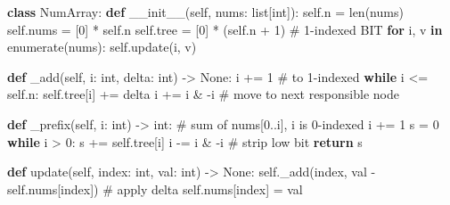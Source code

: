 \documentclass[11pt]{article}
\newenvironment{Shaded}{\begin{snugshade}}{\end{snugshade}}
\newcommand{\BuiltInTok}[1]{\textcolor[rgb]{0.50,0.55,0.55}{#1}}
\newcommand{\CommentTok}[1]{\textcolor[rgb]{0.48,0.49,0.49}{#1}}
\newcommand{\ControlFlowTok}[1]{\textcolor[rgb]{0.99,0.74,0.29}{\textbf{#1}}}
\newcommand{\DecValTok}[1]{\textcolor[rgb]{0.96,0.45,0.00}{#1}}
\newcommand{\FunctionTok}[1]{\textcolor[rgb]{0.56,0.27,0.68}{#1}}
\newcommand{\KeywordTok}[1]{\textcolor[rgb]{0.81,0.81,0.76}{\textbf{#1}}}
\newcommand{\NormalTok}[1]{\textcolor[rgb]{0.81,0.81,0.76}{#1}}
\newcommand{\OperatorTok}[1]{\textcolor[rgb]{0.81,0.81,0.76}{#1}}
\newcommand{\VariableTok}[1]{\textcolor[rgb]{0.15,0.68,0.68}{#1}}
\begin{document}
\begin{Shaded}
\begin{Highlighting}[]
\KeywordTok{class}\NormalTok{ NumArray:}
    \KeywordTok{def} \FunctionTok{\_\_init\_\_}\NormalTok{(}\VariableTok{self}\NormalTok{, nums: }\BuiltInTok{list}\NormalTok{[}\BuiltInTok{int}\NormalTok{]):}
        \VariableTok{self}\NormalTok{.n }\OperatorTok{=} \BuiltInTok{len}\NormalTok{(nums)}
        \VariableTok{self}\NormalTok{.nums }\OperatorTok{=}\NormalTok{ [}\DecValTok{0}\NormalTok{] }\OperatorTok{*} \VariableTok{self}\NormalTok{.n}
        \VariableTok{self}\NormalTok{.tree }\OperatorTok{=}\NormalTok{ [}\DecValTok{0}\NormalTok{] }\OperatorTok{*}\NormalTok{ (}\VariableTok{self}\NormalTok{.n }\OperatorTok{+} \DecValTok{1}\NormalTok{)      }\CommentTok{\# 1{-}indexed BIT}
        \ControlFlowTok{for}\NormalTok{ i, v }\KeywordTok{in} \BuiltInTok{enumerate}\NormalTok{(nums):}
            \VariableTok{self}\NormalTok{.update(i, v)}

    \KeywordTok{def}\NormalTok{ \_add(}\VariableTok{self}\NormalTok{, i: }\BuiltInTok{int}\NormalTok{, delta: }\BuiltInTok{int}\NormalTok{) }\OperatorTok{{-}\textgreater{}} \VariableTok{None}\NormalTok{:}
\NormalTok{        i }\OperatorTok{+=} \DecValTok{1}                              \CommentTok{\# to 1{-}indexed}
        \ControlFlowTok{while}\NormalTok{ i }\OperatorTok{\textless{}=} \VariableTok{self}\NormalTok{.n:}
            \VariableTok{self}\NormalTok{.tree[i] }\OperatorTok{+=}\NormalTok{ delta}
\NormalTok{            i }\OperatorTok{+=}\NormalTok{ i }\OperatorTok{\&} \OperatorTok{{-}}\NormalTok{i                     }\CommentTok{\# move to next responsible node}

    \KeywordTok{def}\NormalTok{ \_prefix(}\VariableTok{self}\NormalTok{, i: }\BuiltInTok{int}\NormalTok{) }\OperatorTok{{-}\textgreater{}} \BuiltInTok{int}\NormalTok{:       }\CommentTok{\# sum of nums[0..i], i is 0{-}indexed}
\NormalTok{        i }\OperatorTok{+=} \DecValTok{1}
\NormalTok{        s }\OperatorTok{=} \DecValTok{0}
        \ControlFlowTok{while}\NormalTok{ i }\OperatorTok{\textgreater{}} \DecValTok{0}\NormalTok{:}
\NormalTok{            s }\OperatorTok{+=} \VariableTok{self}\NormalTok{.tree[i]}
\NormalTok{            i }\OperatorTok{{-}=}\NormalTok{ i }\OperatorTok{\&} \OperatorTok{{-}}\NormalTok{i                     }\CommentTok{\# strip low bit}
        \ControlFlowTok{return}\NormalTok{ s}

    \KeywordTok{def}\NormalTok{ update(}\VariableTok{self}\NormalTok{, index: }\BuiltInTok{int}\NormalTok{, val: }\BuiltInTok{int}\NormalTok{) }\OperatorTok{{-}\textgreater{}} \VariableTok{None}\NormalTok{:}
        \VariableTok{self}\NormalTok{.\_add(index, val }\OperatorTok{{-}} \VariableTok{self}\NormalTok{.nums[index])  }\CommentTok{\# apply delta}
        \VariableTok{self}\NormalTok{.nums[index] }\OperatorTok{=}\NormalTok{ val}


\end{Highlighting}
\end{Shaded}
\end{document}
